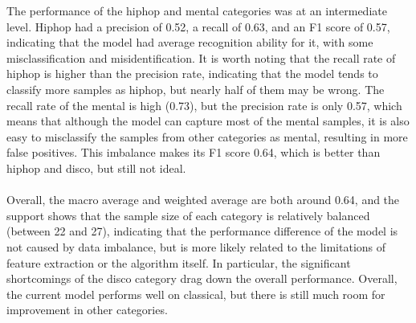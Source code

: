 \noindent The performance of the hiphop and mental categories was at an intermediate level. Hiphop had a precision of 0.52, a recall of 0.63, and an F1 score of 0.57, indicating that the model had average recognition ability for it, with some misclassification and misidentification. It is worth noting that the recall rate of hiphop is higher than the precision rate, indicating that the model tends to classify more samples as hiphop, but nearly half of them may be wrong. The recall rate of the mental is high (0.73), but the precision rate is only 0.57, which means that although the model can capture most of the mental samples, it is also easy to misclassify the samples from other categories as mental, resulting in more false positives. This imbalance makes its F1 score 0.64, which is better than hiphop and disco, but still not ideal.\\
\\
Overall, the macro average and weighted average are both around 0.64, and the support shows that the sample size of each category is relatively balanced (between 22 and 27), indicating that the performance difference of the model is not caused by data imbalance, but is more likely related to the limitations of feature extraction or the algorithm itself. In particular, the significant shortcomings of the disco category drag down the overall performance. Overall, the current model performs well on classical, but there is still much room for improvement in other categories.\\
\\

